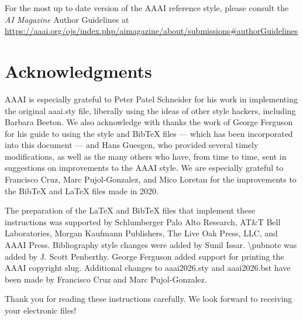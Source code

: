 \vspace{.2em}

For the most up to date version of the AAAI reference style, please
consult the \textit{AI Magazine} Author Guidelines at
\url{https://aaai.org/ojs/index.php/aimagazine/about/submissions#authorGuidelines}

\section{Acknowledgments}

AAAI is especially grateful to Peter Patel Schneider for his work in
implementing the original aaai.sty file, liberally using the ideas of
other style hackers, including Barbara Beeton. We also acknowledge with
thanks the work of George Ferguson for his guide to using the style and
BibTeX files --- which has been incorporated into this document --- and
Hans Guesgen, who provided several timely modifications, as well as the
many others who have, from time to time, sent in suggestions on
improvements to the AAAI style. We are especially grateful to Francisco
Cruz, Marc Pujol-Gonzalez, and Mico Loretan for the improvements to the
Bib\TeX{} and \LaTeX{} files made in 2020.

The preparation of the \LaTeX{} and Bib\TeX{} files that implement these
instructions was supported by Schlumberger Palo Alto Research, AT\&T
Bell Laboratories, Morgan Kaufmann Publishers, The Live Oak Press, LLC,
and AAAI Press. Bibliography style changes were added by Sunil Issar.
\textbackslash pubnote was added by J. Scott Penberthy. George Ferguson
added support for printing the AAAI copyright slug. Additional changes
to aaai2026.sty and aaai2026.bst have been made by Francisco Cruz and
Marc Pujol-Gonzalez.

\bigskip

\noindent Thank you for reading these instructions carefully. We look
forward to receiving your electronic files!



